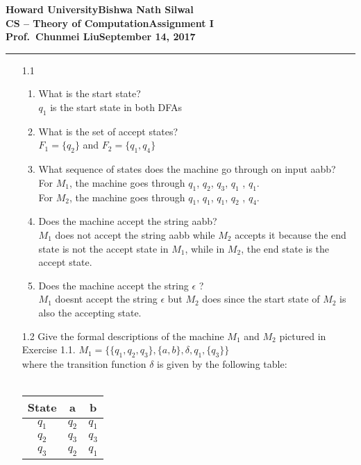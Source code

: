 \documentclass[11pt]{article}
\newcommand{\myname}{Bishwa Nath Silwal}
\newcommand{\assignment}{Assignment I}
\newcommand{\duedate}{September 14, 2017}
\begin{document}
\textbf{Howard University}\hfill\textbf{\myname}\\[0.01in]
\textbf{CS -- Theory of Computation}\hfill\textbf{\assignment}\\[0.01in]
\textbf{Prof.\ Chunmei Liu}\hfill\textbf{\duedate}\\
\smallskip\hrule\bigskip


\begin{enumerate}\bfseries
	\item [1.1] 
	      	      
	      \begin{enumerate}[label=(\alph*)]
	      	\item What is the start state? \\
	      	      {\normalfont $q_1$ is the start state in both DFAs}
	      	\item What is the set of accept states? \\
	      	      {\normalfont $F_1 = \{q_2\}$ and $F_2 = \{q_1, q_4\}$}
	      	\item What sequence of states does the machine go through on input aabb? \\
	      	      {\normalfont For $M_1$, the machine goes through $q_1$, $q_2$, $q_3$, $q_1$ , $q_1$.} \\
	      	      {\normalfont For $M_2$, the machine goes through $q_1$, $q_1$, $q_1$, $q_2$ , $q_4$.}
	      	\item Does the machine accept the string aabb? \\
	      	      {\normalfont $M_1$ does not accept the string aabb while $M_2$ accepts it because the end state is not the accept state in $M_1$, while in $M_2$, the end state is the accept state.} 
	      	\item Does the machine accept the string $\epsilon$ ? \\
	      	      {\normalfont $M_1$ doesnt accept the string $\epsilon$ but $M_2$ does since the start state of $M_2$ is also the accepting state.}
	      \end{enumerate}
	      	      	
	\item [1.2]Give the formal descriptions of the machine $M_1$ and $M_2$ pictured in Exercise 1.1.
	      $M_1 = \{ \{q_1, q_2, q_3\} , \{a,b\}, \delta, q_1, \{q_3\}\}$ \\
	      {\normalfont where the transition function $\delta$ is given by the following table:} \\\
	      \begin{center}
	      	\begin{tabular}{|c |c |c|}
	      		\hline
	      		State & a     & b     \\
	      		\hline 
	      		$q_1$ & $q_2$ & $q_1$ \\ 
	      		\hline
	      		$q_2$ & $q_3$ & $q_3$ \\
	      		\hline
	      		$q_3$ & $q_2$ & $q_1$ \\
	      		\hline
	      	\end{tabular}
	      \end{center}
	      	        		

\end{enumerate}
\end{document}
